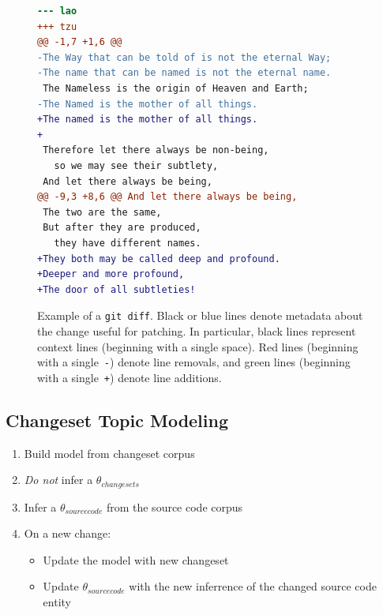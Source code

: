 \begin{figure}[ht]
\centering
\footnotesize
\begin{lstlisting}[language=diff, basicstyle=\ttfamily]
--- lao
+++ tzu
@@ -1,7 +1,6 @@
-The Way that can be told of is not the eternal Way;
-The name that can be named is not the eternal name.
 The Nameless is the origin of Heaven and Earth;
-The Named is the mother of all things.
+The named is the mother of all things.
+
 Therefore let there always be non-being,
   so we may see their subtlety,
 And let there always be being,
@@ -9,3 +8,6 @@ And let there always be being,
 The two are the same,
 But after they are produced,
   they have different names.
+They both may be called deep and profound.
+Deeper and more profound,
+The door of all subtleties!
\end{lstlisting}
\caption{Example of a \texttt{git diff}.
Black or blue lines denote metadata about the change useful for patching.
In particular, black lines represent context lines (beginning with
a single space).
Red lines (beginning with
a single~\texttt{-}) denote line removals, and green lines (beginning
with a single~\texttt{+}) denote line additions.}
\label{fig:diff}
\vspace{-10pt}
\end{figure}

\subsection{Changeset Topic Modeling}
\label{sec:changesets}

\begin{enumerate}
    \item Build model from changeset corpus
    \item \emph{Do not} infer a $\theta_{changesets}$
    \item Infer a $\theta_{source code}$ from the source code corpus
    \item On a new change:
        \begin{itemize}
            \item Update the model with new changeset
            \item Update $\theta_{source code}$ with the new inferrence of the changed source code entity
        \end{itemize}
\end{enumerate}



